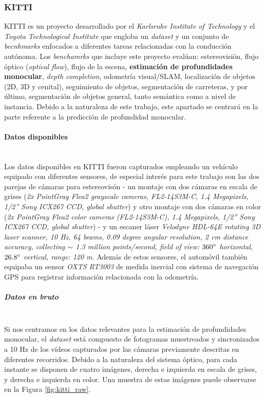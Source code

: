 \subsubsection{KITTI}
KITTI \cite{KITTI-dataset, KITTI-benchmarks, KITTI-road-benchmark, KITTI-sceneflow-benchmark} es un proyecto desarrollado por el \textit{Karlsruhe Institute of Technology} y el \textit{Toyota Technological Institute} que engloba un \textit{dataset} y un conjunto de \textit{becnhmarks} enfocados a diferentes tareas relacionadas con la conducción autónoma. Los \textit{benchamrks} que incluye este proyecto evalúan: estereovisión, flujo óptico (\textit{optical flow}), flujo de la escena, \textbf{estimación de profundidades monocular}, \textit{depth completion}, odometría visual/SLAM, localización de objetos (2D, 3D y cenital), seguimiento de objetos, segmentación de carreteras, y por último, segmentación de objetos general, tanto semántica como a nivel de instancia. Debido a la naturaleza de este trabajo, este apartado se centrará en la parte referente a la predicción de profundidad monocular.

\paragraph{Datos disponibles}\mbox{}\\
Los datos disponibles en KITTI fueron capturados empleando un vehículo equipado con diferentes sensores, de especial interés para este trabajo son las dos parejas de cámaras para estereovisón - un montaje con dos cámaras en escala de grises (\textit{2x PointGray Flea2 grayscale cameras, FL2-14S3M-C, 1.4 Megapixels, 1/2” Sony ICX267 CCD, global shutter}) y otro montaje con dos cámaras en color (\textit{2x PointGray Flea2 color cameras (FL2-14S3M-C), 1.4 Megapixels, 1/2” Sony ICX267 CCD, global shutter}) - y un escaner láser \textit{Velodyne HDL-64E rotating 3D laser scanner, 10 Hz, 64 beams, 0.09 degree angular resolution, 2 cm distance accuracy, collecting $\sim$ 1.3 million points/second, field of view: $360\degree$ horizontal, $26.8\degree$ vertical, range: 120 m}. 
Además de estos sensores, el automóvil también equipaba un sensor \textit{OXTS RT3003} de medida inercial con sistema de navegación GPS para registrar información relacionada con la odometría.

\subparagraph{Datos en bruto}\mbox{}\\
Si nos centramos en los datos relevantes para la estimación de profundidades monocular, el \textit{dataset} está compuesto de fotogramas muestreados y sincronizados a 10 Hz de los vídeos capturados por las cámaras previamente descritas en diferentes recorridos. Debido a la naturaleza del sistema óptico, para cada instante se disponen de cuatro imágenes, derecha e izquierda en escala de grises, y derecha e izquierda en color. Una muestra de estas imágenes puede observarse en la Figura \ref{fig:kitti_raw}.


